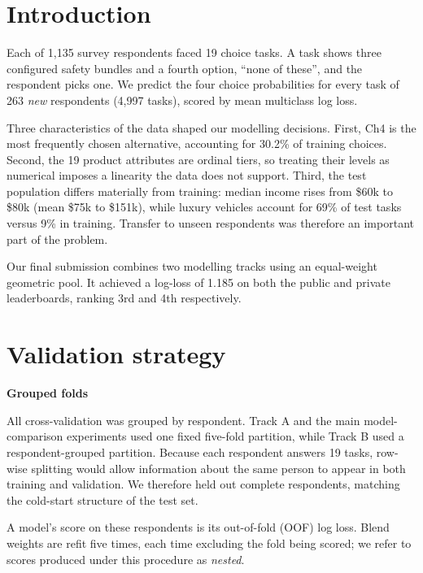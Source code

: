 \documentclass[11pt]{article}
\begin{document}

\section{Introduction}\label{sec:data}

Each of 1{,}135 survey respondents faced 19 choice tasks. A task shows three configured
safety bundles and a fourth option, ``none of these'', and the respondent picks one. We
predict the four choice probabilities for every task of 263 \emph{new} respondents
(4{,}997 tasks), scored by mean multiclass log loss.

Three characteristics of the data shaped our modelling decisions. First, Ch4 is the most
frequently chosen alternative, accounting for 30.2\% of training choices. Second, the 19
product attributes are ordinal tiers, so treating their levels as numerical imposes a
linearity the data does not support. Third, the test population differs materially from
training: median income rises from \$60k to \$80k (mean \$75k to \$151k), while luxury
vehicles account for 69\% of test tasks versus 9\% in training. Transfer to unseen
respondents was therefore an important part of the problem.

Our final submission combines two modelling tracks using an
equal-weight geometric pool. It achieved a log-loss of 1.185 on both the public and
private leaderboards, ranking 3rd and 4th respectively.

\section{Validation strategy}\label{sec:valid}

\noindent\textbf{Grouped folds}\par
All cross-validation was grouped by respondent. Track A and the main model-comparison
experiments used one fixed five-fold partition, while Track B used a respondent-grouped partition. Because each respondent answers 19 tasks,
row-wise splitting would allow information about the same person to appear in both
training and validation. We therefore held out complete respondents, matching the
cold-start structure of the test set.

A model's score on these respondents is its out-of-fold (OOF) log loss. Blend weights are
refit five times, each time excluding the fold being scored; we refer to scores produced
under this procedure as \emph{nested}.
\end{document}
